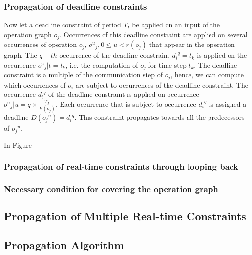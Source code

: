 \subsubsection{Propagation of deadline constraints}

Now let a deadline constraint of period $T_I$ be applied on an input of the operation graph $o_j$. Occurrences of this deadline constraint are applied on several occurrences of operation $o_j$, ${o^u}_j, 0 \leq u < r(o_j)$ that appear in the operation graph. The $q-th$ occurrence of the deadline constraint ${d_i}^q = t_k$ is applied on the occurrence ${o^u}_j | t = t_k$, i.e. the computation of ${o_j}$ for time step $t_k$. The deadline constraint is a multiple of the communication step of ${o_j}$, hence, we can compute which occurrences of ${o_i}$ are subject to occurrences of the deadline constraint. The occurrence ${d_i}^q$ of the deadline constraint is applied on occurrence ${o^u}_j | u = q \times \frac{T_I}{H(o_j)}$. Each occurrence that is subject to occurrence ${d_i}^q$ is assigned a deadline $D({o_j}^u) = {d_i}^q$. This constraint propagates towards all the predecessors of ${o_j}^u$.

In Figure

\subsubsection{Propagation of real-time constraints through looping back}

\subsubsection{Necessary condition for covering the operation graph}

\subsection{Propagation of Multiple Real-time Constraints}

\subsection{Propagation Algorithm}


